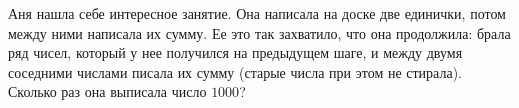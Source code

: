 \begin{problem}
	Аня нашла себе интересное занятие. Она написала на доске две единички, потом между ними написала их сумму. Ее это так захватило, что она продолжила: брала ряд чисел, который у нее получился на предыдущем шаге, и между двумя соседними числами писала их сумму (старые числа при этом не стирала). Сколько раз она выписала число $1000$?
\end{problem}

